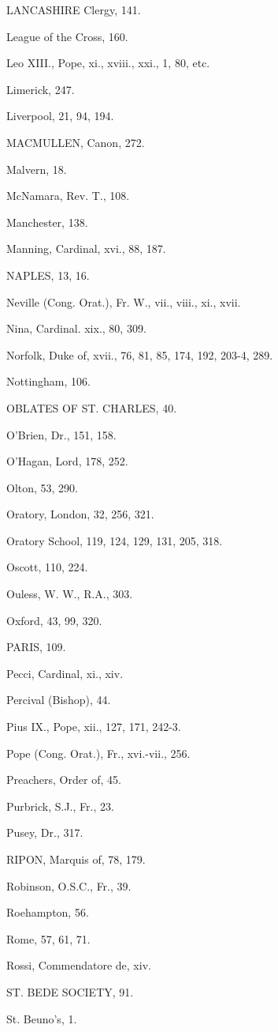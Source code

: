 LANCASHIRE Clergy, 141.

League of the Cross, 160.

Leo XIII., Pope, xi., xviii., xxi., 1, 80, etc.

Limerick, 247.

Liverpool, 21, 94, 194.

MACMULLEN, Canon, 272.

Malvern, 18.

McNamara, Rev. T., 108.

Manchester, 138.

Manning, Cardinal, xvi., 88, 187.

NAPLES, 13, 16.

Neville (Cong. Orat.), Fr. W., vii., viii., xi., xvii.

Nina, Cardinal. xix., 80, 309.

Norfolk, Duke of, xvii., 76, 81, 85, 174, 192, 203-4, 289.

Nottingham, 106.

OBLATES OF ST.
CHARLES, 40.

O'Brien, Dr., 151, 158.

O'Hagan, Lord, 178, 252.

Olton, 53, 290.

Oratory, London, 32, 256, 321.

Oratory School, 119, 124, 129, 131, 205, 318.

Oscott, 110, 224.

Ouless, W. W., R.A., 303.

Oxford, 43, 99, 320.

PARIS, 109.

Pecci, Cardinal, xi., xiv.

Percival (Bishop), 44.

Pius IX., Pope, xii., 127, 171, 242-3.

Pope (Cong. Orat.), Fr., xvi.-vii., 256.

Preachers, Order of, 45.

Purbrick, S.J., Fr., 23.

Pusey, Dr., 317.

RIPON, Marquis of, 78, 179.

Robinson, O.S.C., Fr., 39.

Roehampton, 56.

Rome, 57, 61, 71.

Rossi, Commendatore de, xiv.

ST. BEDE SOCIETY,
91.

St. Beuno's, 1.

